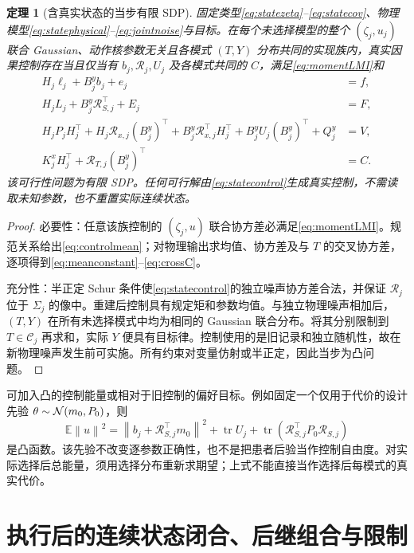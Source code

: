 \documentclass[UTF8,fontset=fandol,zihao=5,a4paper]{ctexart}
\newcommand{\E}{\mathbb E}\newcommand{\Pp}{\mathbb P}
\newcommand{\norm}[1]{\left\lVert#1\right\rVert}
\DeclareMathOperator{\tr}{tr}\DeclareMathOperator{\TV}{TV}
\newtheorem{theorem}{定理}[section]
\theoremstyle{definition}
\theoremstyle{remark}\newtheorem{remark}[theorem]{说明}
\numberwithin{equation}{section}
\begin{document}
\begin{theorem}[含真实状态的当步有限 SDP]
\label{thm:statecompile}
固定类型\eqref{eq:statezeta}--\eqref{eq:statecov}、物理模型\eqref{eq:statephysical}--\eqref{eq:jointnoise}与目标。在每个未选择模型的整个 $(\zeta_j,u_j)$ 联合 Gaussian、动作核参数无关且各模式 $(T,Y)$ 分布共同的实现族内，真实因果控制存在当且仅当有 $b_j,\mathcal R_j,U_j$ 及各模式共同的 $C$，满足\eqref{eq:momentLMI}和
\begin{align}
H_j\ell_j+B_j^yb_j+e_j&=f,\label{eq:meanconstant}\\
H_jL_j+B_j^y\mathcal R_{S,j}^\top+E_j&=F,\label{eq:meanslope}\\
H_jP_jH_j^\top+H_j\mathcal R_{x,j}(B_j^y)^\top
+B_j^y\mathcal R_{x,j}^\top H_j^\top
+B_j^yU_j(B_j^y)^\top+Q_j^y&=V,\label{eq:outputcov}\\
K_j^xH_j^\top+\mathcal R_{T,j}(B_j^y)^\top&=C.\label{eq:crossC}
\end{align}
该可行性问题为有限 SDP。任何可行解由\eqref{eq:statecontrol}生成真实控制，不需读取未知参数，也不重置实际连续状态。
\end{theorem}
\begin{proof}
必要性：任意该族控制的 $(\zeta_j,u)$ 联合协方差必满足\eqref{eq:momentLMI}。规范关系给出\eqref{eq:controlmean}；对物理输出求均值、协方差及与 $T$ 的交叉协方差，逐项得到\eqref{eq:meanconstant}--\eqref{eq:crossC}。

充分性：半正定 Schur 条件使\eqref{eq:statecontrol}的独立噪声协方差合法，并保证 $\mathcal R_j$ 位于 $\Sigma_j$ 的像中。重建后控制具有规定矩和参数均值。与独立物理噪声相加后，$(T,Y)$ 在所有未选择模式中均为相同的 Gaussian 联合分布。将其分别限制到 $T\in\mathcal C_j$ 再求和，实际 $Y$ 便具有目标律。控制使用的是旧记录和独立随机性，故在新物理噪声发生前可实施。所有约束对变量仿射或半正定，因此当步为凸问题。
\end{proof}

可加入凸的控制能量或相对于旧控制的偏好目标。例如固定一个仅用于代价的设计先验 $\theta\sim\mathcal N(m_0,P_0)$，则
\[
\E\norm u^2=\norm{b_j+\mathcal R_{S,j}^\top m_0}^2+
\tr U_j+\tr(\mathcal R_{S,j}^\top P_0\mathcal R_{S,j})
\]
是凸函数。该先验不改变逐参数正确性，也不是把患者后验当作控制自由度。对实际选择后总能量，须用选择分布重新求期望；上式不能直接当作选择后每模式的真实代价。

\section{执行后的连续状态闭合、后继组合与限制}
\label{sec:stateupdate}
\end{document}
